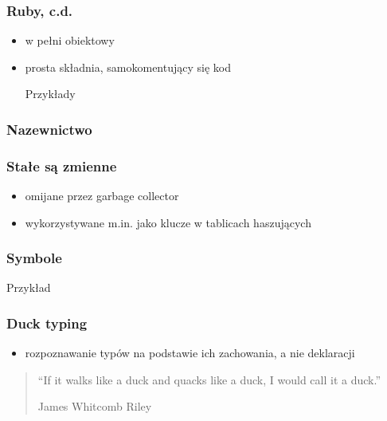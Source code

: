 \documentclass[12t]{beamer}
\begin{document}
\begin{frame}
  \frametitle{Ruby, c.d.}
  \begin{itemize}
  \item w pełni obiektowy
  \item prosta składnia, samokomentujący się kod
    \begin{block}{Przykłady}
      
    \end{block}
  \end{itemize}
\end{frame}

\begin{frame}
  \frametitle{Nazewnictwo}
  \begin{small}
    
  \end{small}
\end{frame}

\begin{frame}
  \frametitle{Stałe są zmienne}
  
\end{frame}

\begin{frame}
  \begin{itemize}
  \item omijane przez garbage collector
  \item wykorzystywane m.in. jako klucze w tablicach haszujących
  \end{itemize}
  \frametitle{Symbole}
  \begin{block}{Przykład}
    
  \end{block}
\end{frame}

\begin{frame}
  \frametitle{Duck typing}
  \begin{itemize}
  \item rozpoznawanie typów na podstawie ich zachowania, a nie deklaracji
  \end{itemize}
\end{frame}

\begin{frame}
  \begin{quote}
    “If it walks like a duck and quacks like a duck, I would call it a
    duck.”

    \hfill James Whitcomb Riley
  \end{quote}
\end{frame}
\end{document}
